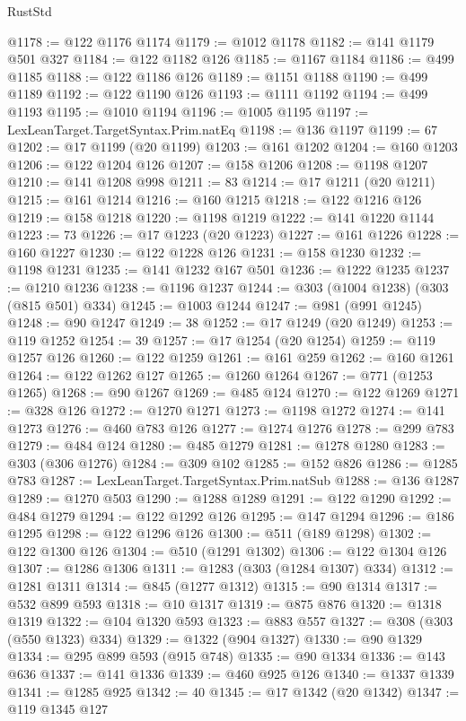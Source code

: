 \begin{lexlean}{RustStd}
\begin{coremodule}
{\begin{coremodule}
{{{{{{{{{{{{{{{{{{{{{{{{{{{{{{{{{{{{{{{{{{{{{{{{{{{{{{{{{{{{{{{{{{{{@1178 := @122 @1176 @1174
@1179 := @1012 @1178
@1182 := @141 @1179 @501 @327
@1184 := @122 @1182 @126
@1185 := @1167 @1184
@1186 := @499 @1185
@1188 := @122 @1186 @126
@1189 := @1151 @1188
@1190 := @499 @1189
@1192 := @122 @1190 @126
@1193 := @1111 @1192
@1194 := @499 @1193
@1195 := @1010 @1194
@1196 := @1005 @1195
@1197 := LexLeanTarget.TargetSyntax.Prim.natEq
@1198 := @136 @1197
@1199 := 67
@1202 := @17 @1199 (@20 @1199)
@1203 := @161 @1202
@1204 := @160 @1203
@1206 := @122 @1204 @126
@1207 := @158 @1206
@1208 := @1198 @1207
@1210 := @141 @1208 @998
@1211 := 83
@1214 := @17 @1211 (@20 @1211)
@1215 := @161 @1214
@1216 := @160 @1215
@1218 := @122 @1216 @126
@1219 := @158 @1218
@1220 := @1198 @1219
@1222 := @141 @1220 @1144
@1223 := 73
@1226 := @17 @1223 (@20 @1223)
@1227 := @161 @1226
@1228 := @160 @1227
@1230 := @122 @1228 @126
@1231 := @158 @1230
@1232 := @1198 @1231
@1235 := @141 @1232 @167 @501
@1236 := @1222 @1235
@1237 := @1210 @1236
@1238 := @1196 @1237
@1244 := @303 (@1004 @1238) (@303 (@815 @501) @334)
@1245 := @1003 @1244
@1247 := @981 (@991 @1245)
@1248 := @90 @1247
@1249 := 38
@1252 := @17 @1249 (@20 @1249)
@1253 := @119 @1252
@1254 := 39
@1257 := @17 @1254 (@20 @1254)
@1259 := @119 @1257 @126
@1260 := @122 @1259
@1261 := @161 @259
@1262 := @160 @1261
@1264 := @122 @1262 @127
@1265 := @1260 @1264
@1267 := @771 (@1253 @1265)
@1268 := @90 @1267
@1269 := @485 @124
@1270 := @122 @1269
@1271 := @328 @126
@1272 := @1270 @1271
@1273 := @1198 @1272
@1274 := @141 @1273
@1276 := @460 @783 @126
@1277 := @1274 @1276
@1278 := @299 @783
@1279 := @484 @124
@1280 := @485 @1279
@1281 := @1278 @1280
@1283 := @303 (@306 @1276)
@1284 := @309 @102
@1285 := @152 @826
@1286 := @1285 @783
@1287 := LexLeanTarget.TargetSyntax.Prim.natSub
@1288 := @136 @1287
@1289 := @1270 @503
@1290 := @1288 @1289
@1291 := @122 @1290
@1292 := @484 @1279
@1294 := @122 @1292 @126
@1295 := @147 @1294
@1296 := @186 @1295
@1298 := @122 @1296 @126
@1300 := @511 (@189 @1298)
@1302 := @122 @1300 @126
@1304 := @510 (@1291 @1302)
@1306 := @122 @1304 @126
@1307 := @1286 @1306
@1311 := @1283 (@303 (@1284 @1307) @334)
@1312 := @1281 @1311
@1314 := @845 (@1277 @1312)
@1315 := @90 @1314
@1317 := @532 @899 @593
@1318 := @10 @1317
@1319 := @875 @876
@1320 := @1318 @1319
@1322 := @104 @1320 @593
@1323 := @883 @557
@1327 := @308 (@303 (@550 @1323) @334)
@1329 := @1322 (@904 @1327)
@1330 := @90 @1329
@1334 := @295 @899 @593 (@915 @748)
@1335 := @90 @1334
@1336 := @143 @636
@1337 := @141 @1336
@1339 := @460 @925 @126
@1340 := @1337 @1339
@1341 := @1285 @925
@1342 := 40
@1345 := @17 @1342 (@20 @1342)
@1347 := @119 @1345 @127
}}}}}}}}}}}}}}}}}}}}}}}}}}}}}}}}}}}}}}}}}}}}}}}}}}}}}}}}}}}}}}}}}}}}
\end{coremodule}}
\end{coremodule}
\end{lexlean}
